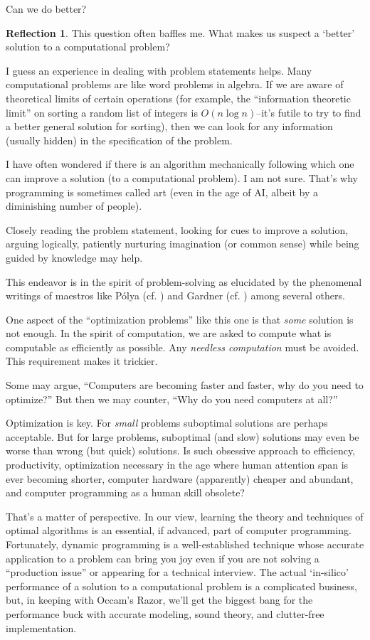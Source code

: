 \documentclass[english,notitlepage,smartquotes]{hgbreport}
\theoremstyle{definition}
\theoremstyle{definition}
\theoremstyle{remark}
\theoremstyle{definition}
\theoremstyle{plain}
\theoremstyle{definition}
\newtheorem{reflection}{Reflection}
\begin{document}
Can we do better?
\begin{reflection}
This question often baffles me. What makes us suspect a `better' solution to a computational problem? 

I guess an experience in dealing with problem statements helps. Many computational problems are like word problems in algebra. If we are aware of theoretical limits of certain operations (for example, the ``information theoretic limit'' on sorting a random list of integers is $O(n\log n)$--it's futile to try to find a better general solution for sorting), then we can look for any information (usually hidden) in the specification of the problem.

I have often wondered if there is an algorithm mechanically following which one can improve a solution (to a computational problem). I am not sure. That's why programming is sometimes called art (even in the age of AI, albeit by a diminishing number of people).

Closely reading the problem statement, looking for cues to improve a solution, arguing logically, patiently nurturing imagination (or common sense) while being guided by knowledge may help.

This endeavor is in the spirit of problem-solving as elucidated by the phenomenal writings of maestros like P\'olya (cf. \cite{Polya2004}) and Gardner (cf. \cite{GardnerSciAmColumns}) among several others.

One aspect of the ``optimization problems'' like this one is that \emph{some} solution is not enough. In the spirit of computation, we are asked to compute what is computable as efficiently as possible. Any \emph{needless computation} must be avoided. This requirement makes it trickier.

Some may argue, ``Computers are becoming faster and faster, why do you need to optimize?'' But then we may counter, ``Why do you need computers at all?''

Optimization is key. For \emph{small} problems suboptimal solutions are perhaps acceptable. But for large problems, suboptimal (and slow) solutions may even be worse than wrong (but quick) solutions. Is such obsessive approach to efficiency, productivity, optimization necessary in the age where human attention span is ever becoming shorter, computer hardware (apparently) cheaper and abundant, and computer programming as a human skill obsolete? 

That's a matter of perspective. In our view, learning the theory and techniques of optimal algorithms is an essential, if advanced, part of computer programming. Fortunately, dynamic programming is a well-established technique whose accurate application to a problem can bring you joy even if you are not solving a ``production issue'' or appearing for a technical interview. The actual `in-silico' performance of a solution to a computational problem is a complicated business, but, in keeping with Occam's Razor, we'll get the biggest bang for the performance buck with accurate modeling, sound theory, and clutter-free implementation.


\end{reflection}
\end{document}
